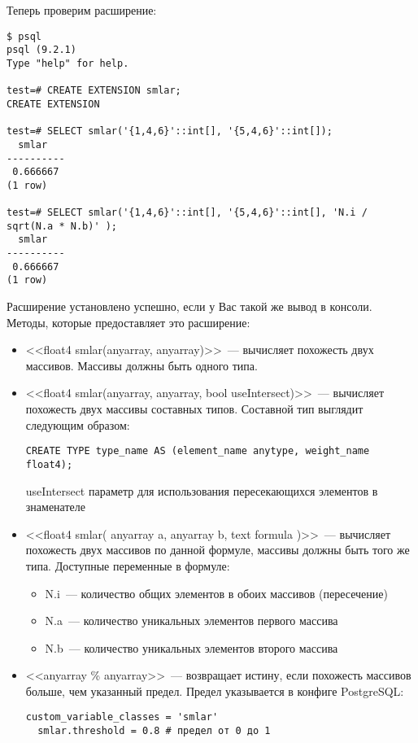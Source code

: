 Теперь проверим расширение:

\begin{lstlisting}[label=lst:smlar4,caption=Проверка smlar]
$ psql
psql (9.2.1)
Type "help" for help.

test=# CREATE EXTENSION smlar;
CREATE EXTENSION

test=# SELECT smlar('{1,4,6}'::int[], '{5,4,6}'::int[]);
  smlar
----------
 0.666667
(1 row)

test=# SELECT smlar('{1,4,6}'::int[], '{5,4,6}'::int[], 'N.i / sqrt(N.a * N.b)' );
  smlar
----------
 0.666667
(1 row)
\end{lstlisting}

Расширение установлено успешно, если у Вас такой же вывод в консоли. Методы, которые предоставляет это расширение:

\begin{itemize}
  \item <<float4 smlar(anyarray, anyarray)>>~--- вычисляет похожесть двух массивов. Массивы должны быть одного типа.
  \item <<float4 smlar(anyarray, anyarray, bool useIntersect)>>~--- вычисляет похожесть двух массивы составных типов. Составной тип выглядит следующим образом:
  \begin{lstlisting}[label=lst:smlar5,caption=Составной тип]
  CREATE TYPE type_name AS (element_name anytype, weight_name float4);
  \end{lstlisting}
  useIntersect параметр для использования пересекающихся элементов в знаменателе
  \item <<float4 smlar( anyarray a, anyarray b, text formula )>>~--- вычисляет похожесть двух массивов по данной формуле, массивы должны быть того же типа. Доступные переменные в формуле:
    \begin{itemize}
      \item N.i~--- количество общих элементов в обоих массивов (пересечение)
      \item N.a~--- количество уникальных элементов первого массива
      \item N.b~--- количество уникальных элементов второго массива
    \end{itemize}
  \item <<anyarray \% anyarray>>~--- возвращает истину, если похожесть массивов больше, чем указанный предел. Предел указывается в конфиге PostgreSQL:
  \begin{lstlisting}[label=lst:smlar6,caption=Smlar предел]
  custom_variable_classes = 'smlar'
  smlar.threshold = 0.8 # предел от 0 до 1
  \end{lstlisting}


\end{itemize}
